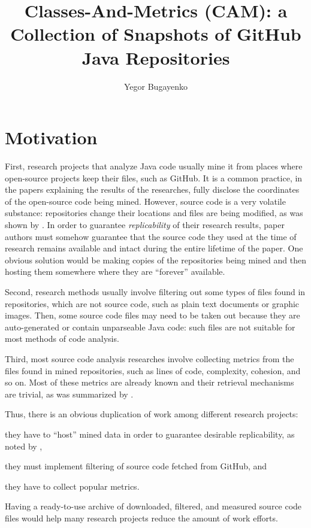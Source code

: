 \documentclass[sigplan,nonacm,natbib=false]{acmart}
\title{Classes-And-Metrics (CAM): a Collection of Snapshots of GitHub Java Repositories}
\author{Yegor Bugayenko}
\affiliation{\institution{Huawei, Russia, Moscow}\city{}\country{}}
\begin{document}
\maketitle

\section*{Motivation}

First, research projects that analyze Java code usually mine it from places where open-source projects keep their files, such as GitHub. It is a common practice, in the papers explaining the results of the researches, fully disclose the coordinates of the open-source code being mined. However, source code is a very volatile substance: repositories change their locations and files are being modified, as was shown by \citet{5463348}. In order to guarantee \emph{replicability} of their research results, paper authors must somehow guarantee that the source code they used at the time of research remains available and intact during the entire lifetime of the paper. One obvious solution would be making copies of the repositories being mined and then hosting them somewhere where they are ``forever'' available.

Second, research methods usually involve filtering out some types of files found in repositories, which are not source code, such as plain text documents or graphic images. Then, some source code files may need to be taken out because they are auto-generated or contain unparseable Java code: such files are not suitable for most methods of code analysis.

Third, most source code analysis researches involve collecting metrics from the files found in mined repositories, such as lines of code, complexity, cohesion, and so on. Most of these metrics are already known and their retrieval mechanisms are trivial, as was summarized by \citet{nunez2017source}.

Thus, there is an obvious duplication of work among different research projects:
\begin{inparaenum}[(a)]
\item they have to ``host'' mined data in order to guarantee desirable replicability, as noted by \citet{7887704},
\item they must implement filtering of source code fetched from GitHub,
and
\item they have to collect popular metrics.
\end{inparaenum}
Having a ready-to-use archive of downloaded, filtered, and measured source code files would help many research projects reduce the amount of work efforts.
\end{document}
